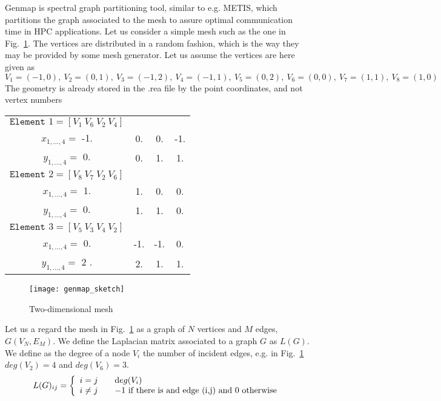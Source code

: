 Genmap is spectral graph partitioning tool, similar to e.g. METIS, which partitions the graph associated to the mesh to assure optimal communication time in HPC applications. Let us consider a simple mesh such as the one in Fig.~\ref{fig:genmap}. The vertices are distributed in a random fashion, which is the way they may be provided by some mesh generator. Let us assume the vertices are here given as 
\[V_1=(-1,0),\ V_2=(0,1),\ V_3=(-1,2),\ V_4=(-1,1),\ V_5=(0,2),\ V_6=(0,0),\ V_7=(1,1),\ V_8=(1,0)\] 
The geometry is already stored in the .rea file by the point coordinates, and not vertex numbers
\begin{tabular}{c c c c}
  \(\texttt{Element } 1=[V_1\ V_6\ V_2\ V_4]\)&&&\\
  \(x_{1,\ldots,4}=\) -1. & 0. & 0. & -1.\\
  \(y_{1,\ldots,4}=\) 0.  & 0. & 1. &1.\\
  \(\texttt{Element } 2=[V_8\ V_7\ V_2\ V_6]\)&&&\\
  \(x_{1,\ldots,4}=\) 1. & 1. & 0. & 0.\\
  \(y_{1,\ldots,4}=\) 0. & 1. & 1. &0.\\
  \(\texttt{Element } 3=[V_5\ V_3\ V_4\ V_2]\)&&&\\
  \(x_{1,\ldots,4}=\) 0. & -1. & -1. & 0.\\
  \(y_{1,\ldots,4}=\) 2 .& 2.  & 1.  &1.\\
  \end{tabular}

\begin{figure}
\centering
\texttt{[image: genmap\_sketch]}
\caption{Two-dimensional mesh}
\label{fig:genmap}
\end{figure}

Let us a regard the mesh in Fig.~\ref{fig:genmap} as a graph of \(N\) vertices and \(M\) edges, \(G(V_N,E_M)\). We define the Laplacian matrix associated to a graph \(G\) as \(L(G)\). We define as the degree of a node \(V_i\) the number of incident edges, e.g. in Fig.~\ref{fig:genmap} \(deg(V_2)=4\) and \(deg(V_6)=3\).
\begin{equation}
L(G)_{ij}= \left\{
  \begin{array}{l l}
    i=j & \quad \mathrm deg(V_i)\\
    i\neq j & \quad -1 \text{ if there is and edge (i,j) and } 0 \text{ otherwise}
  \end{array} \right .
\end{equation}

